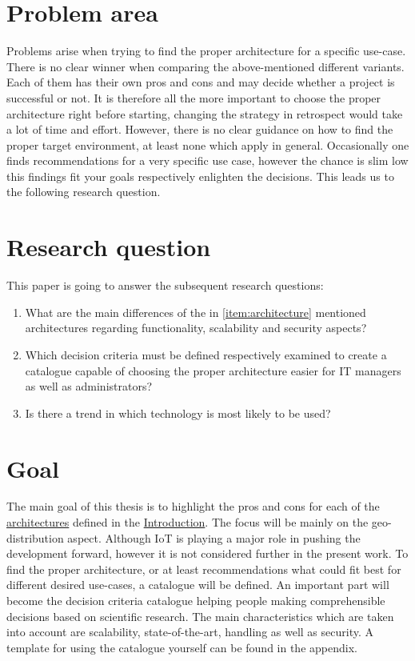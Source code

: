 \documentclass[MSC,Master,english]{twbook}%
\begin{document}
\section{Problem area}
Problems arise when trying to find the proper architecture for a specific use-case. There is no clear winner when comparing the above-mentioned different variants. Each of them has their own pros and cons and may decide whether a project is successful or not. It is therefore all the more important to choose the proper architecture right before starting, changing the strategy in retrospect would take a lot of time and effort. However, there is no clear guidance on how to find the proper target environment, at least none which apply in general. Occasionally one finds recommendations for a very specific use case, however the chance is slim low this findings fit your goals respectively enlighten the decisions. This leads us to the following research question.

\section{Research question}
\label{sec:rq}
This paper is going to answer the subsequent research questions:
\begin{enumerate}
    \item What are the main differences of the in \autoref{item:architecture} mentioned architectures regarding functionality, scalability and security aspects?
    \item Which decision criteria must be defined respectively examined to create a catalogue capable
    of choosing the proper architecture easier for \ac{IT} managers as well as administrators?
    \item Is there a trend in which technology is most likely to be used?
\end{enumerate}

\section{Goal}
\label{sec:goal}
The main goal of this thesis is to highlight the pros and cons for each of the \hyperref[item:architecture]{architectures} defined in the \hyperref[chap:introduction]{Introduction}. The focus will be mainly on the geo-distribution aspect. Although \ac{IoT} is playing a major role in pushing the development forward, however it is not considered further in the present work. To find the proper architecture, or at least recommendations what could fit best for different desired use-cases, a catalogue will be defined. An important part will become the decision criteria catalogue helping people making comprehensible decisions based on scientific research. The main characteristics which are taken into account are scalability, state-of-the-art, handling as well as security. A template for using the catalogue yourself can be found in the appendix.
\end{document}
